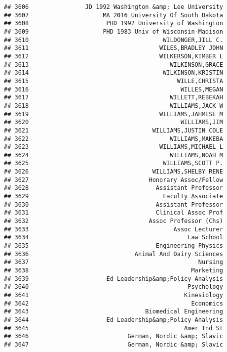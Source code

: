 \documentclass[
]{article}
\begin{document}
\begin{verbatim}
## 3606                JD 1992 Washington &amp; Lee University
## 3607                     MA 2016 University Of South Dakota
## 3608                      PHD 1992 University of Washington
## 3609                     PHD 1983 Univ of Wisconsin-Madison
## 3610                                      WILDONGER,JILL C.
## 3611                                     WILES,BRADLEY JOHN
## 3612                                     WILKERSON,KIMBER L
## 3613                                        WILKINSON,GRACE
## 3614                                      WILKINSON,KRISTIN
## 3615                                          WILLE,CHRISTA
## 3616                                           WILLES,MEGAN
## 3617                                        WILLETT,REBEKAH
## 3618                                        WILLIAMS,JACK W
## 3619                                     WILLIAMS,JAHMESE M
## 3620                                           WILLIAMS,JIM
## 3621                                   WILLIAMS,JUSTIN COLE
## 3622                                        WILLIAMS,MAKEBA
## 3623                                     WILLIAMS,MICHAEL L
## 3624                                        WILLIAMS,NOAH M
## 3625                                      WILLIAMS,SCOTT P.
## 3626                                   WILLIAMS,SHELBY RENE
## 3627                                  Honorary Assoc/Fellow
## 3628                                    Assistant Professor
## 3629                                      Faculty Associate
## 3630                                    Assistant Professor
## 3631                                    Clinical Assoc Prof
## 3632                                  Assoc Professor (Chs)
## 3633                                         Assoc Lecturer
## 3634                                             Law School
## 3635                                    Engineering Physics
## 3636                              Animal And Dairy Sciences
## 3637                                                Nursing
## 3638                                              Marketing
## 3639                      Ed Leadership&amp;Policy Analysis
## 3640                                             Psychology
## 3641                                            Kinesiology
## 3642                                              Economics
## 3643                                 Biomedical Engineering
## 3644                      Ed Leadership&amp;Policy Analysis
## 3645                                            Amer Ind St
## 3646                            German, Nordic &amp; Slavic
## 3647                            German, Nordic &amp; Slavic

\end{verbatim}
\end{document}
